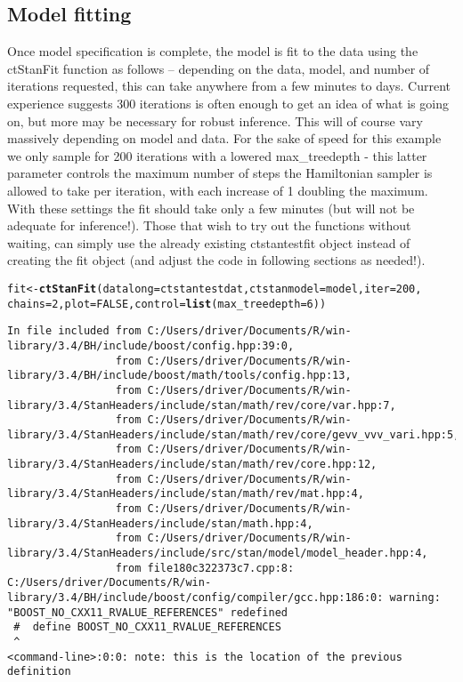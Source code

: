 \documentclass[nojss]{jss}\usepackage[]{graphicx}\usepackage[]{color}
\makeatletter
\newcommand{\hlnum}[1]{\textcolor[rgb]{0.686,0.059,0.569}{#1}}%
\newcommand{\hlstd}[1]{\textcolor[rgb]{0.345,0.345,0.345}{#1}}%
\newcommand{\hlkwb}[1]{\textcolor[rgb]{0.69,0.353,0.396}{#1}}%
\newcommand{\hlkwc}[1]{\textcolor[rgb]{0.333,0.667,0.333}{#1}}%
\newcommand{\hlkwd}[1]{\textcolor[rgb]{0.737,0.353,0.396}{\textbf{#1}}}%
\newenvironment{kframe}{%
 \def\at@end@of@kframe{}%
 \ifinner\ifhmode%
  \def\at@end@of@kframe{\end{minipage}}%
  \begin{minipage}{\columnwidth}%
 \fi\fi%
 \def\FrameCommand##1{\hskip\@totalleftmargin \hskip-\fboxsep
 \colorbox{shadecolor}{##1}\hskip-\fboxsep
     \hskip-\linewidth \hskip-\@totalleftmargin \hskip\columnwidth}%
 \MakeFramed {\advance\hsize-\width
   \@totalleftmargin\z@ \linewidth\hsize
   \@setminipage}}%
 {\par\unskip\endMakeFramed%
 \at@end@of@kframe}
\newenvironment{knitrout}{}{} %
\makeatother
\begin{document}
\subsection{Model fitting}
Once model specification is complete, the model is fit to the data using the ctStanFit function as follows -- depending on the data, model, and number of iterations requested, this can take anywhere from a few minutes to days. Current experience suggests 300 iterations is often enough to get an idea of what is going on, but more may be necessary for robust inference. This will of course vary massively depending on model and data. For the sake of speed for this example we only sample for 200 iterations with a lowered max\_treedepth - this latter parameter controls the maximum number of steps the Hamiltonian sampler is allowed to take per iteration, with each increase of 1 doubling the maximum. With these settings the fit should take only a few minutes (but will not be adequate for inference!). Those that wish to try out the functions without waiting, can simply use the already existing ctstantestfit object instead of creating the fit object (and adjust the code in following sections as needed!).

\begin{knitrout}\small
{}\color{fgcolor}\begin{kframe}
\begin{alltt}
\hlstd{fit}\hlkwb{<-}\hlkwd{ctStanFit}\hlstd{(}\hlkwc{datalong} \hlstd{= ctstantestdat,} \hlkwc{ctstanmodel} \hlstd{= model,} \hlkwc{iter}\hlstd{=}\hlnum{200}\hlstd{,}
  \hlkwc{chains}\hlstd{=}\hlnum{2}\hlstd{,} \hlkwc{plot}\hlstd{=}\hlnum{FALSE}\hlstd{,} \hlkwc{control}\hlstd{=}\hlkwd{list}\hlstd{(}\hlkwc{max_treedepth} \hlstd{=} \hlnum{6}\hlstd{))}
\end{alltt}
\begin{verbatim}
In file included from C:/Users/driver/Documents/R/win-library/3.4/BH/include/boost/config.hpp:39:0,
                 from C:/Users/driver/Documents/R/win-library/3.4/BH/include/boost/math/tools/config.hpp:13,
                 from C:/Users/driver/Documents/R/win-library/3.4/StanHeaders/include/stan/math/rev/core/var.hpp:7,
                 from C:/Users/driver/Documents/R/win-library/3.4/StanHeaders/include/stan/math/rev/core/gevv_vvv_vari.hpp:5,
                 from C:/Users/driver/Documents/R/win-library/3.4/StanHeaders/include/stan/math/rev/core.hpp:12,
                 from C:/Users/driver/Documents/R/win-library/3.4/StanHeaders/include/stan/math/rev/mat.hpp:4,
                 from C:/Users/driver/Documents/R/win-library/3.4/StanHeaders/include/stan/math.hpp:4,
                 from C:/Users/driver/Documents/R/win-library/3.4/StanHeaders/include/src/stan/model/model_header.hpp:4,
                 from file180c322373c7.cpp:8:
C:/Users/driver/Documents/R/win-library/3.4/BH/include/boost/config/compiler/gcc.hpp:186:0: warning: "BOOST_NO_CXX11_RVALUE_REFERENCES" redefined
 #  define BOOST_NO_CXX11_RVALUE_REFERENCES
 ^
<command-line>:0:0: note: this is the location of the previous definition
\end{verbatim}
\end{kframe}
\end{knitrout}
\end{document}
